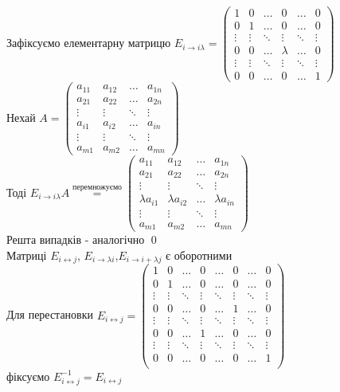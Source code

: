 \documentclass[a4paper, 10pt]{article}
\theoremstyle{theoremdd}
\begin{document}
	\proof
	Зафіксуємо елементарну матрицю $E_{i \rightarrow i \lambda} = \begin{pmatrix}
	1 & 0 & \dots & 0 & \dots & 0 \\
	0 & 1 & \dots & 0 & \dots & 0 \\
	\vdots & \vdots & \ddots & \vdots & \ddots & \vdots \\
	0 & 0 & \dots & \lambda & \dots & 0 \\
	\vdots & \vdots & \ddots & \vdots & \ddots & \vdots \\
	0 & 0 & \dots & 0 & \dots & 1
\end{pmatrix}$\\
	Нехай $A = \begin{pmatrix}
	a_{11} & a_{12} & \dots & a_{1n} \\
	a_{21} & a_{22} & \dots & a_{2n} \\
	\vdots & \vdots & \ddots & \vdots \\
	a_{i1} & a_{i2} & \dots & a_{in} \\
	\vdots & \vdots & \ddots & \vdots \\
	a_{m1} & a_{m2} & \dots & a_{mn}
	\end{pmatrix}$ \\
	Тоді $E_{i \rightarrow i\lambda} A \overset{\textrm{перемножуємо}}{=} \begin{pmatrix}
	a_{11} & a_{12} & \dots & a_{1n} \\
	a_{21} & a_{22} & \dots & a_{2n} \\
	\vdots & \vdots & \ddots & \vdots \\
	\lambda a_{i1} & \lambda a_{i2} & \dots & \lambda a_{in} \\
	\vdots & \vdots & \ddots & \vdots \\
	a_{m1} & a_{m2} & \dots & a_{mn}
	\end{pmatrix}$\\
	Решта випадків - аналогічно \qed
	\bigskip \\
	 Матриці $E_{i \leftrightarrow j}$, $E_{i \rightarrow \lambda i}$,$E_{i \rightarrow i + \lambda j}$ є оборотними\\
	\proof
	Для перестановки $E_{i \leftrightarrow j} = \begin{pmatrix}
	1 & 0 & \dots & 0 & \dots & 0 & \dots & 0 \\
	0 & 1 & \dots & 0 & \dots & 0 & \dots & 0 \\
	\vdots & \vdots &\ddots & \vdots & \ddots & \vdots & \ddots & \vdots \\
	0 & 0 & \dots & 0 & \dots & 1 & \dots & 0 \\
	\vdots & \vdots &\ddots & \vdots & \ddots & \vdots & \ddots & \vdots \\
	0 & 0 & \dots & 1 & \dots & 0 & \dots & 0 \\
	\vdots & \vdots &\ddots & \vdots & \ddots & \vdots & \ddots & \vdots \\
	0 & 0 & \dots & 0 & \dots & 0 & \dots & 1 \\
	\end{pmatrix}$ \\ фіксуємо $E_{i \leftrightarrow j}^{-1} = E_{i \leftrightarrow j}$\\
\end{document}
